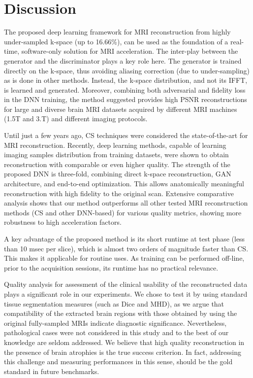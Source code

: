 \documentclass[10pt,journal,compsoc]{IEEEtran}
\begin{document}
\section{Discussion}\label{conclusions_section}
The proposed deep learning framework for MRI reconstruction from highly under-sampled k-space (up to 16.66\%), can be used as the foundation of a real-time, software-only solution for MRI acceleration.
The inter-play between the generator and the discriminator plays a key role here. The generator is trained directly on the k-space, thus avoiding aliasing correction (due to under-sampling) as is done in other methods.
Instead, the k-space distribution, and not its IFFT, is learned and generated. Moreover, combining both adversarial and fidelity loss in the DNN training, the method suggested provides high PSNR reconstructions for large and diverse brain MRI datasets acquired by different MRI machines (1.5T and 3.T) and different imaging protocols.

Until just a few years ago, CS techniques were considered the state-of-the-art for MRI reconstruction. Recently, deep learning methods, capable of learning imaging samples distribution from training datasets, were shown to obtain reconstruction with comparable or even higher quality. The strength of the proposed DNN is three-fold, combining direct k-space reconstruction, GAN architecture, and end-to-end optimization.
This allows anatomically meaningful reconstruction with high fidelity to the original scan. Extensive comparative analysis shows that our method outperforms all other tested MRI reconstruction methods (CS and other DNN-based) for various quality metrics, showing more robustness to high acceleration factors.

A key advantage of the proposed method is its short runtime at test phase (less than 10 msec per slice), which is almost two orders of magnitude faster than CS. This makes it applicable for routine uses. As training can be performed off-line, prior to the acquisition sessions, its runtime has no practical relevance.

Quality analysis for assessment of the clinical usability of the reconstructed data plays a significant role in our experiments.
We chose to test it by using standard tissue segmentation measures (such as Dice and MHD), as we argue that compatibility of the extracted brain regions with those obtained by using the original fully-sampled MRIs indicate diagnostic significance. Nevertheless, pathological cases were not considered in this study and to the best of our knowledge are seldom addressed. We believe that high quality reconstruction in the presence of brain atrophies is the true success criterion. In fact, addressing this challenge and measuring performances in this sense, should be the gold standard in future benchmarks.
\end{document}
